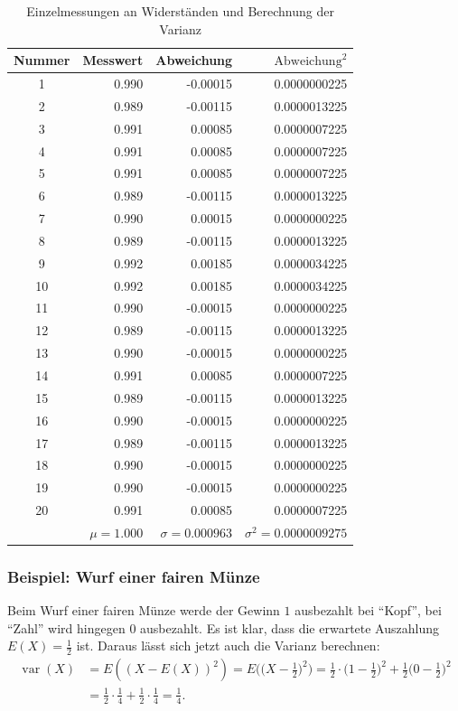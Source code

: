 \begin{table}
\begin{center}
\begin{tabular}{|c|r|r|r|}
\hline
Nummer&Messwert&Abweichung&$\text{Abweichung}^2$\\
\hline
1&0.990&-0.00015&0.0000000225\\
2&0.989&-0.00115&0.0000013225\\
3&0.991&0.00085&0.0000007225\\
4&0.991&0.00085&0.0000007225\\
5&0.991&0.00085&0.0000007225\\
6&0.989&-0.00115&0.0000013225\\
7&0.990&0.00015&0.0000000225\\
8&0.989&-0.00115&0.0000013225\\
9&0.992&0.00185&0.0000034225\\
10&0.992&0.00185&0.0000034225\\
11&0.990&-0.00015&0.0000000225\\
12&0.989&-0.00115&0.0000013225\\
13&0.990&-0.00015&0.0000000225\\
14&0.991&0.00085&0.0000007225\\
15&0.989&-0.00115&0.0000013225\\
16&0.990&-0.00015&0.0000000225\\
17&0.989&-0.00115&0.0000013225\\
18&0.990&-0.00015&0.0000000225\\
19&0.990&-0.00015&0.0000000225\\
20&0.991&0.00085&0.0000007225\\
\hline
&$\mu=1.000$&$\sigma=0.000963$&
$\sigma^2=0.0000009275$\\
\hline
\end{tabular}
\end{center}
\caption{Einzelmessungen an Widerständen und Berechnung der Varianz
\label{varianzberechnung}}
\end{table}

\subsubsection{Beispiel: Wurf einer fairen Münze}
Beim Wurf einer fairen Münze werde der Gewinn $1$ ausbezahlt bei
``Kopf'', bei ``Zahl'' wird hingegen $0$ ausbezahlt.
Es ist klar, dass die erwartete Auszahlung $E(X)=\frac12$ ist.
Daraus lässt sich jetzt auch die Varianz berechnen:
\begin{align*}
\operatorname{var}(X)
&=
E((X-E(X))^2)=E\biggl(\biggl(X-\frac12\biggr)^2\biggr)
=\frac12\cdot \biggl(1-\frac12\biggr)^2+\frac12\biggl(0-\frac12\biggr)^2\\
&=\frac12\cdot\frac14+\frac12\cdot\frac14=\frac14.
\end{align*}

